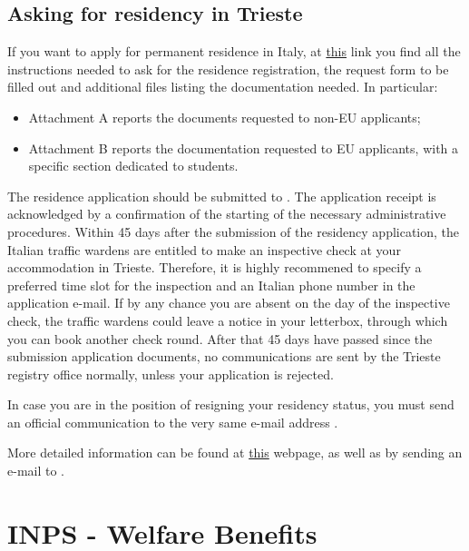 \documentclass{sissavademecum}
\begin{document}
\section{Asking for residency in Trieste}

If you want to apply for permanent residence in Italy, at \href{https://www.comune.trieste.it/-/anagrafe-iscrizioneperresidenza?inheritRedirect=true}{this} link you find all the instructions needed to ask for the residence registration, the request form to be filled out and additional files listing the documentation needed. In particular:
\begin{itemize}
	\item Attachment A reports the documents requested to non-EU applicants;
	\item Attachment B reports the documentation requested to EU applicants, with a specific section dedicated to students.
\end{itemize}

The residence application should be submitted to . The application receipt is acknowledged by a confirmation of the starting of the necessary administrative procedures. Within 45 days after the submission of the residency application, the Italian traffic wardens are entitled to make an inspective check at your accommodation in Trieste. Therefore, it is highly recommened to specify a preferred time slot for the inspection and an Italian phone number in the application e-mail. If by any chance you are absent on the day of the inspective check, the traffic wardens could leave a notice in your letterbox, through which you can book another check round. After that 45 days have passed since the submission application documents, no communications are sent by the Trieste registry office normally, unless your application is rejected.

In case you are in the position of resigning your residency status, you must send an official communication to the very same e-mail address .

More detailed information can be found at \href{http://www.welcomeoffice.fvg.it/practical-info/entry-and-stay/residence-registration-iscrizione-anagrafica/}{this} webpage, as well as by sending an e-mail to .


\chapter{INPS - Welfare Benefits}
\label{sec:gestione_separata_inps}
\end{document}
